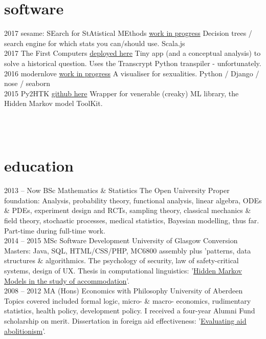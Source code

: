 \documentclass[]{friggeri-cv}
\newcommand{\altHmms}{\underline{\href{https://www.gleech.org/accommodation}{Hidden Markov Models in the study of accommodation}}}%
\newcommand{\altAid}{\underline{\href{https://www.gleech.org/aid}{Evaluating aid abolitionism}}}%
\newcommand{\sparkCert}{\underline{\href{http://www.oreilly.com/data/sparkcert.html}{O'Reilly Developer Certification for Spark}}}%
\newcommand{\scala}{\underline{\href{https://www.coursera.org/specializations/scala}{Odersky`s Scala Specialisation}}}%
\begin{document}
\section{software}
% 
\begin{entrylist}
  \entry
    {2017}
    {sesame: SEarch for StAtistical MEthods}
    {\href{}{work in progress}}
    {Decision trees / search engine for which stats you can/should use. Scala.js}
\\
  \entry
    {2017}
    {The First Computers}
    {\href{https://www.gleech.org/first-computers/}{deployed here}}
    {Tiny app (and a conceptual analysis) to solve a historical question. Uses the Transcrypt Python transpiler - unfortunately.}
\\
  \entry
     {2016}
     {modernlove}
     {\href{}{work in progress}}
     {A visualiser for sexualities. Python / Django / nose / seaborn }
\\
  \entry
    {2015}
    {Py2HTK}
    {\href{https://github.com/g-leech/Py2HTK}{github here}}
    {Wrapper for venerable (creaky) ML library, the Hidden Markov model ToolKit. }

\end{entrylist}
\\\\
\section{education}
\begin{entrylist}
  \entry
    {2013 – Now}
    {BSc Mathematics \& Statistics}
    {The Open University}
    {Proper foundation: Analysis, probability theory, functional analysis, linear algebra, ODEs \& PDEs, experiment design and RCTs, sampling theory, classical mechanics \& field theory, stochastic processes, medical statistics, Bayesian modelling, thus far. Part-time during full-time work.}\smallskip \\
    
  \entry
    {2014 – 2015}
    {MSc Software Development}
    {University of Glasgow}
    {Conversion Masters: Java, SQL, HTML/CSS/PHP, MC6800 assembly plus 'patterns, data structures \& algorithmics. The psychology of security, law of safety-critical systems, design of UX. Thesis in computational linguistics: '\altHmms{}'.} \smallskip\\
  \entry
    {2008 – 2012}
    {MA (Hons) Economics with Philosophy} 
    {University of Aberdeen}
    {Topics covered included formal logic, micro- \& macro- economics, rudimentary
statistics, health policy, development policy. I received a four-year Alumni Fund scholarship on merit. Dissertation in foreign aid effectiveness: '\altAid{}'.}
\end{entrylist}
\end{document}
